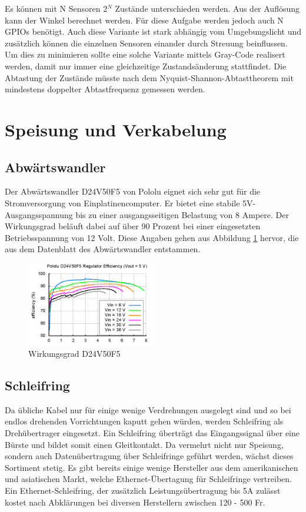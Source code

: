  Es können mit N Sensoren 2$^N$ Zustände unterschieden werden. Aus der Auflösung kann der Winkel berechnet werden. Für diese Aufgabe werden jedoch auch N GPIOs benötigt. Auch diese Variante ist stark abhängig vom Umgebungslicht und zusätzlich können die einzelnen Sensoren einander durch Streuung beinflussen. Um dies zu minimieren sollte eine solche Variante mittels Gray-Code realisert werden, damit nur immer eine gleichzeitige Zustandsänderung stattfindet. Die Abtastung der Zustände müsste nach dem Nyquist-Shannon-Abtasttheorem mit mindestens doppelter Abtastfrequenz gemessen werden.  

\section{Speisung und Verkabelung}
\label{sec:Speisung und Verkabelung}

\subsection{Abwärtswandler}
\label{subsec:Abwaertswandler}
Der Abwärtswandler D24V50F5 von Pololu eignet sich sehr gut für die Stromversorgung von Einplatinencomputer. Er bietet eine stabile 5V-Ausgangsspannung bis zu einer ausgangsseitigen Belastung von 8 Ampere. Der Wirkungsgrad beläuft dabei auf über 90 Prozent bei einer eingesetzten Betriebsspannung von 12 Volt. Diese Angaben gehen aus Abbildung \ref{fig:D24V50F5} hervor, die aus dem Datenblatt des Abwärtswandler entstammen.

\begin{figure}[H]
	\centering
	\includegraphics[width=0.5\textwidth]
	{resources/D24V50F5.PNG}
	\caption[Wirkungsgrad D24V50F5]{Wirkungsgrad D24V50F5 \protect\cite{D24V50F5}}
	\label{fig:D24V50F5}
\end{figure}

\subsection{Schleifring}
\label{subsec:Schleifring}
Da übliche Kabel nur für einige wenige Verdrehungen ausgelegt sind und so bei endlos drehenden Vorrichtungen kaputt gehen würden, werden Schleifring als Drehübertrager eingesetzt. Ein Schleifring überträgt das Eingangssignal über eine Bürste und bildet somit einen Gleitkontakt. Da vermehrt nicht nur Speisung, sondern auch Datenübertragung über Schleifringe geführt werden, wächst dieses Sortiment stetig. Es gibt bereits einige wenige Hersteller aus dem amerikanischen und asiatischen Markt, welche Ethernet-Übertagung für Schleifringe vertreiben. Ein Ethernet-Schleifring, der zusätzlich Leistungsübertragung bis 5A zulässt kostet nach Abklärungen bei diversen Herstellern zwischen 120 - 500 Fr.  



